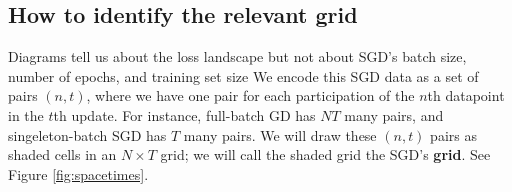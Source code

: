 \documentclass[anon,12pt]{colt2021} %
\newtheorem*{rmk*}{Remark}
\newcommand{\wabs}[1]{\left|#1\right|}
\newcommand{\Aut}{\text{\textnormal{Aut}}}
\newcommand{\uvalue}{\text{\textnormal{uvalue}}}
\newcommand{\edges}{\text{\textnormal{edges}}}
\newcommand{\sizeddia}[2]{%
    \begin{gathered}%
        \texttt{[image: ../diagrams/\#1.png]}%
    \end{gathered}%
}
\newcommand{\sdia}[1]{\protect \sizeddia{#1}{0.10}}
\newcommand{\mend}{\hfill $\Diamond$}
\begin{document}


    \vfill
    \subsection{How to identify the relevant grid}            \label{appendix:draw-spacetime}

        Diagrams tell us about the loss landscape but not about
        SGD's batch size, number of epochs, and training set size
        We encode this SGD data as a set of pairs $(n,t)$, where we have
        one pair for each participation of the $n$th datapoint in the $t$th
        update.  For instance, full-batch GD has $NT$ many pairs, and
        singeleton-batch SGD has $T$ many pairs.  We will draw these
        $(n,t)$ pairs as shaded cells in an $N\times T$ grid; we will call
        the shaded grid the SGD's \textbf{grid}.  See Figure
        \ref{fig:spacetimes}.  
\end{document}
